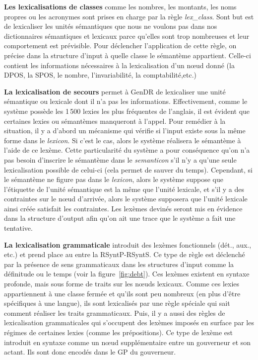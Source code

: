\textbf{Les lexicalisations de classes}
comme les nombres, les montants, les noms propres ou les acronymes sont prises en charge par la règle \emph{lex\_class}. Sont but est de lexicaliser les unités sémantiques que nous ne voulons pas dans nos dictionnaires sémantiques et lexicaux parce qu'elles sont trop nombreuses et leur comportement est prévisible. Pour déclencher l'application de cette règle, on précise dans la structure d'input à quelle classe le sémantème appartient. Celle-ci contient les informations nécessaires à la lexicalisation d'un n\oe{}ud donné (la \ac{DPOS}, la \ac{SPOS}, le nombre, l'invariabilité, la comptabilité,etc.)

\textbf{La lexicalisation de secours} 
permet à GenDR de lexicaliser une unité sémantique ou lexicale dont il n'a pas les informations. Effectivement, comme le système possède les 1\,500 lexies les plus fréquentes de l'anglais, il est évident que certaines lexies ou sémantèmes manqueront à l'appel. Pour remédier à la situation, il y a d'abord un mécanisme qui vérifie si l'input existe sous la même forme dans le \emph{lexicon}. Si c'est le cas, alors le système réalisera le sémantème à l'aide de ce lexème. Cette particularité du système a pour conséquence qu'on n'a pas besoin d'inscrire le sémantème dans le \emph{semanticon} s'il n'y a qu'une seule lexicalisation possible de celui-ci (cela permet de sauver du temps). Cependant, si le sémantème ne figure pas dans le \emph{lexicon}, alors le système suppose que l'étiquette de l'unité sémantique est la même que l'unité lexicale, et s'il y a des contraintes sur le n\oe{}ud d'arrivée, alors le système supposera que l'unité lexicale ainsi créée satisfait les contraintes. Les lexèmes devinés seront mis en évidence dans la structure d'output afin qu'on ait une trace que le système a fait une tentative.

\textbf{La lexicalisation grammaticale}
introduit des lexèmes fonctionnels (dét., aux., etc.) et prend place au entre la \ac{RSyntP}-\ac{RSyntS}. Ce type de règle est déclenché par la présence de sens grammaticaux dans les structures d'input comme la définitude ou le temps (voir la figure~\ref{fig:debt}). Ces lexèmes existent en syntaxe profonde, mais sous forme de traits sur les n\oe{}uds lexicaux. Comme ces lexies appartiennent à une classe fermée et qu'ils sont peu nombreux (en plus d'être spécifiques à une langue), ils sont lexicalisés par une règle spéciale qui sait comment réaliser les traits grammaticaux. Puis, il y a aussi des règles de lexicalisation grammaticales qui s'occupent des lexèmes imposés en surface par les régimes de certaines lexies (comme les prépositions). Ce type de lexème est introduit en syntaxe comme un n\oe{}ud supplémentaire entre un gouverneur et son actant. Ils sont donc encodés dans le \ac{GP} du gouverneur. 

